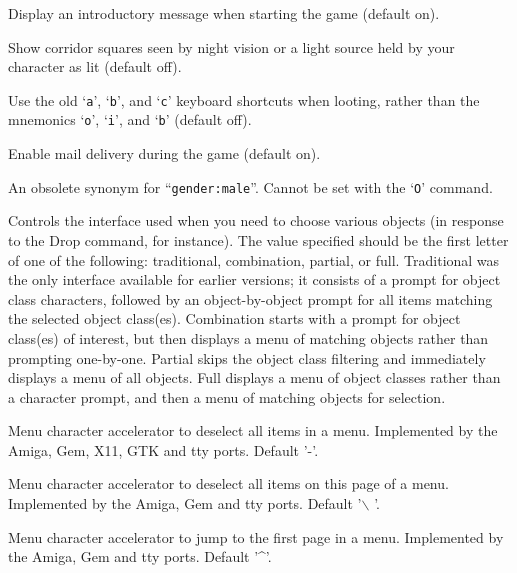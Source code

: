 \item[\ib{legacy}]
Display an introductory message when starting the game (default on).

\item[\ib{lit\_corridor}]
Show corridor squares seen by night vision or a light source held by your
character as lit (default off).

\item[\ib{lootabc}]
Use the old `{\tt a}', `{\tt b}', and `{\tt c}' keyboard shortcuts when
looting, rather than the mnemonics `{\tt o}', `{\tt i}', and `{\tt b}' (default off).

\item[\ib{mail}]
Enable mail delivery during the game (default on).

\item[\ib{male}]
An obsolete synonym for ``{\tt gender:male}''.
Cannot be set with the `{\tt O}' command.

\item[\ib{menustyle}]
Controls the interface used when you need to choose various objects (in
response to the Drop command, for instance).  The value specified should
be the first letter of one of the following:  traditional, combination,
partial, or full.  Traditional was the only interface available for
earlier versions; it consists of a prompt for object class characters,
followed by an object-by-object prompt for all items matching the selected
object class(es).  Combination starts with a prompt for object class(es)
of interest, but then displays a menu of matching objects rather than
prompting one-by-one.  Partial skips the object class filtering and
immediately displays a menu of all objects.  Full displays a menu of
object classes rather than a character prompt, and then a menu of matching
objects for selection.

\item[\ib{menu\_deselect\_all}]
Menu character accelerator to deselect all items in a menu.
Implemented by the Amiga, Gem, X11, GTK and tty ports.
Default '-'.

\item[\ib{menu\_deselect\_page}]
Menu character accelerator to deselect all items on this page of a menu.
Implemented by the Amiga, Gem and tty ports.
Default '$\backslash$ '.

\item[\ib{menu\_first\_page}]
Menu character accelerator to jump to the first page in a menu.
Implemented by the Amiga, Gem and tty ports.
Default '\^{}'.

